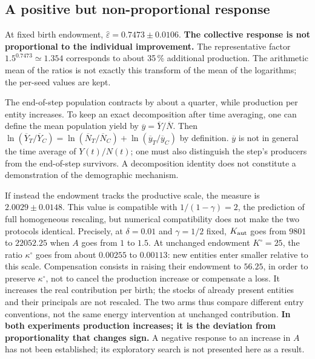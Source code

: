 \subsection{A positive but non-proportional response}
At fixed birth endowment, $\widehat\varepsilon=0.7473\pm0.0106$.
\textbf{The collective response is not proportional to the individual
improvement.} The representative factor $1.5^{0.7473}\simeq1.354$
corresponds to about 35\,\% additional production. The arithmetic mean
of the ratios is not exactly this transform of the mean of the
logarithms; the per-seed values are kept.


The end-of-step population contracts by about a quarter, while
production per entity increases. To keep an exact decomposition after
time averaging, one can define the mean population yield by
$\overline y=\overline Y/\overline N$. Then
$\ln(\overline Y_T/\overline Y_C)=
\ln(\overline N_T/\overline N_C)+\ln(\overline y_T/\overline y_C)$
by definition. $\overline y$ is not in general the time average of
$Y(t)/N(t)$; one must also distinguish the step's producers from the
end-of-step survivors. A decomposition identity does not constitute a
demonstration of the demographic mechanism.

If instead the endowment tracks the productive scale, the measure is
$2.0029\pm0.0148$. This value is compatible with $1/(1-\gamma)=2$, the
prediction of full homogeneous rescaling, but numerical compatibility
does not make the two protocols identical. Precisely, at $\delta=0.01$
and $\gamma=1/2$ fixed, $K_{\rm aut}$ goes from $9801$ to $22052.25$ when
$A$ goes from $1$ to $1.5$. At unchanged endowment $K^\circ=25$, the
ratio $\kappa^\circ$ goes from about $0.00255$ to $0.00113$: new
entities enter smaller relative to this scale. Compensation consists in
raising their endowment to $56.25$, in order to preserve $\kappa^\circ$,
not to cancel the production increase or compensate a loss. It
increases the real contribution per birth; the stocks of already
present entities and their principals are not rescaled. The two arms
thus compare different entry conventions, not the same energy
intervention at unchanged contribution.
\textbf{In both experiments production increases; it is the deviation
from proportionality that changes sign.} A negative response to an
increase in $A$ has not been established; its exploratory search is not
presented here as a result.

